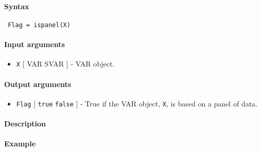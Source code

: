 


	\paragraph{Syntax}
 
 \begin{verbatim}
 Flag = ispanel(X)
 \end{verbatim}
 
 \paragraph{Input arguments}
 
 \begin{itemize}
 \item
   \texttt{X} {[} VAR \textbar{} SVAR {]} - VAR object.
 \end{itemize}
 
 \paragraph{Output arguments}
 
 \begin{itemize}
 \item
   \texttt{Flag} {[} \texttt{true} \textbar{} \texttt{false} {]} - True
   if the VAR object, \texttt{X}, is based on a panel of data.
 \end{itemize}
 
 \paragraph{Description}
 
 \paragraph{Example}


